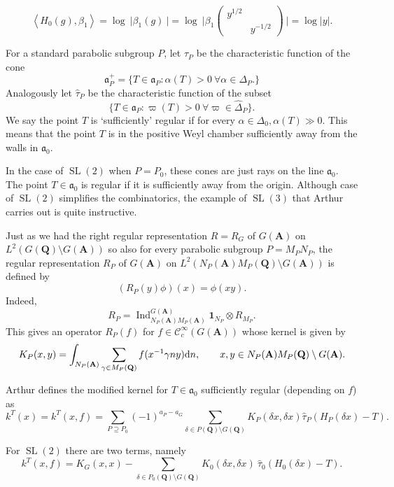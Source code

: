 \documentclass[11pt]{amsart}
\def\apg{a_{P} - a_{G}}
\def\A{\mathbf A}
\def\Q{\mathbf Q}
\def\CCC{\mathcal C}
\def\aaa{\mathfrak a}
\def\cb#1{{\color{blue}#1}}
\def\d{\text d}
\def\bs{\setminus} 			%
\def\Ind{\operatorname{Ind}}
\def\Ltwo{L^2}
\def\mod#1{\lvert #1 \rvert} %
\def\sl{\operatorname{SL}}
\def\sprod#1#2{\left\langle #1 , #2 \right\rangle}  %
\theoremstyle{remark}
\begin{document}
\cb{
	\[ \sprod{H_0(g)}{\beta_1} = \log \ \mod{\beta_1(g)\ } = \log \ \mod{\beta_1 
			\begin{pmatrix} y^{1/2} & \\ & y^{-1/2} \end{pmatrix} \ } = \log \mod{y}. \]
}

For a standard parabolic subgroup $P$, let $\tau_P$ be the characteristic function of the cone 
\[ \aaa_P^+ = \{ T \in \aaa_P : \alpha(T) > 0 \ \forall \alpha \in \Delta_P. \} \]
Analogously let $\hat\tau_P$ be the characteristic function of the subset
\[ \{ T \in \aaa_P : \varpi(T) > 0 \ \forall \varpi \in \hat\Delta_P \}. \]
We say the point $T$ is `sufficiently' regular if for every $\alpha \in \Delta_0, \alpha(T) \gg 0$. This means that the point $T$ is in the positive Weyl chamber sufficiently away from the walls in $\aaa_0$. 

\cb{ In the case of $\sl(2)$ when $P = P_0$, these cones are just rays on the line $\aaa_0$. The point $T \in \aaa_0$ is regular if it is sufficiently away from the origin.} Although case of $\sl(2)$ simplifies the combinatorics, the example of $\sl(3)$ that Arthur carries out is quite instructive. 

Just as we had the right regular representation $R = R_G$ of $G(\A)$ on $\Ltwo(G(\Q) \bs G(\A))$ so also for every parabolic subgroup $P = M_P N_P$, the regular representation $R_P$ of $G(\A)$ on $\Ltwo(N_P(\A) M_P(\Q) \bs G(\A))$ is defined by 
\[ (R_P(y)\phi)(x) = \phi(xy). \]
Indeed, 
\[ R_P = \Ind_{N_P(\A)M_P(\A)}^{G(\A)} \mathbf 1_{N_P} \otimes R_{M_P}. \]
This gives an operator $R_P(f)$ for $f \in \CCC_c^\infty(G(\A))$ whose kernel is given by
\[ K_P(x, y) = \int_{N_P(\A)} \sum_{\gamma \in M_P(\Q)} f(x^{-1} \gamma n y) \d n, \qquad 
		x, y \in N_P(\A)M_P(\Q)\bs G(\A). \]

Arthur defines the modified kernel for $T \in \aaa_0$ sufficiently regular (depending on $f$) as
\begin{equation} \label{kernel}
	k^T(x) = k^T(x, f) = \sum_{P \supseteq P_0} (-1)^{\apg} \sum_{\delta \in P(\Q) \bs G(\Q)}
		K_P(\delta x, \delta x) \hat\tau_P(H_P(\delta x) - T). 
\end{equation}

\cb{For $\sl(2)$ there are two terms, namely}
\cb{\begin{equation} \label{k_sl2}
	k^T(x, f) = K_G(x, x) - \sum_{\delta \in P_0(\Q) \bs G(\Q)} K_0(\delta x, \delta x) \ \hat\tau_0(H_0(\delta x) - T).
\end{equation} }
\end{document}
